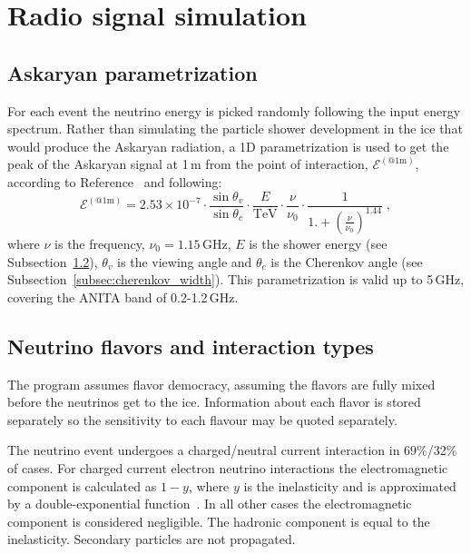 \section{Radio signal simulation} 
\label{sec:rf}

\subsection{Askaryan parametrization}
For each event the neutrino energy is picked randomly following the input energy spectrum.
Rather than simulating the particle shower development in the ice that
would produce the Askaryan radiation, a 1D parametrization is used 
to get the peak of the Askaryan signal at 1\,m from the point of interaction, $\mathcal{E}^{(\mathrm{@ 1m})}$, 
according to Reference~\cite{JaimeAskarian2000} and following:
\begin{equation}
\label{eq:vmmhz}
\mathcal{E}^{(\mathrm{@ 1m})} =2.53\times 10^{-7}\cdot \frac{\sin{\theta_v}}{\sin{\theta_c}}\cdot  \frac{E}{\mathrm{TeV}} \cdot \frac{\nu}{\nu_0} \cdot \frac{1}{1.+\left( \frac{\nu}{\nu_0} \right)^{1.44}} \;,
\end{equation}
\noindent where $\nu$ is the frequency, $\nu_0=1.15$\,GHz, $E$ is
the shower energy (see Subsection~\ref{subsec:emhadshower}),
$\theta_v$ is the viewing angle and $\theta_c$ is the Cherenkov angle
(see Subsection~\ref{subsec:cherenkov_width}). 
This parametrization is valid up to 5\,GHz, covering the ANITA
band of 0.2-1.2\,GHz.

\subsection{Neutrino flavors and interaction types}
\label{subsec:emhadshower}
The \icemc program assumes flavor democracy, assuming 
the flavors are fully mixed before the neutrinos get to the ice.
Information about each flavor is stored separately so the sensitivity to each flavour may be quoted separately.

The neutrino event undergoes a charged/neutral current interaction in
$69\%$/32\% of cases.
For charged current electron neutrino interactions the electromagnetic
component is calculated as $1-y$, where $y$ is the inelasticity and is
approximated by a double-exponential function~\cite{gandhi}. 
In all other cases the electromagnetic component is considered negligible.
The hadronic component is equal to the inelasticity.
Secondary particles are not propagated.

